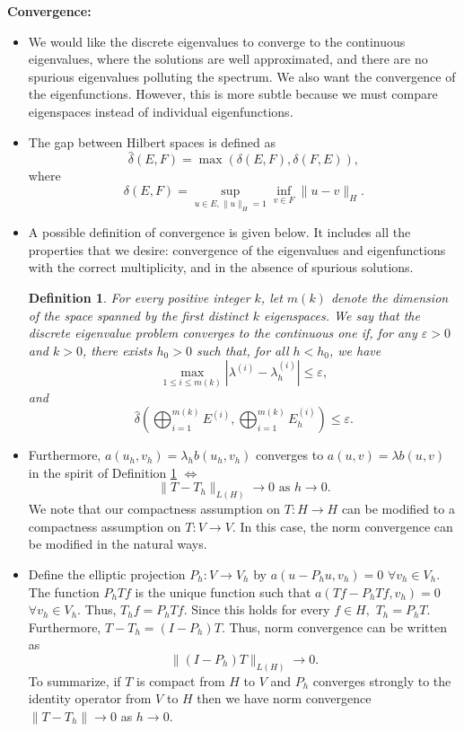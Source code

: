 \documentclass[12pt,a4paper]{article}
\theoremstyle{boldthm}
\theoremstyle{bolddefn}
\newtheorem{definition}[theorem]{Definition}
\begin{document}
\textbf{Convergence:}
\begin{itemize}
    \item We would like the discrete eigenvalues to converge to the continuous eigenvalues, where the solutions are well approximated, and there are no spurious eigenvalues polluting the spectrum. We also want the convergence of the eigenfunctions. However, this is more subtle because we must compare eigenspaces instead of individual eigenfunctions. 
    \item The gap between Hilbert spaces is defined as $$\hat \delta (E, F) = \max ( \delta(E, F) , \delta(F, E)),$$
    where
    $$ \delta(E, F) = \sup_{u \in E, \|u\|_H = 1} \inf_{v \in F} \|u-v\|_H.$$
    \item A possible definition of convergence is given below. It includes all the properties that we desire: convergence of the eigenvalues and eigenfunctions with the correct multiplicity, and in the absence of spurious solutions. 
    \begin{definition}\label{conv}
    For every positive integer $k$, let $m(k)$ denote the dimension of the space spanned by the first distinct $k$ eigenspaces. We say that the discrete eigenvalue problem converges to the continuous one if, for any $\varepsilon>0$ and $k>0$, there exists $h_0>0$ such that, for all $h<h_0$, we have
    $$
    \max_{1\leq i\leq m(k)}
    \left|\lambda^{(i)}-\lambda_h^{(i)}\right|
    \leq \varepsilon,
    $$
    and
    $$
    \widehat{\delta}
    \left(
    \bigoplus_{i=1}^{m(k)} E^{(i)},
    \bigoplus_{i=1}^{m(k)} E_h^{(i)}
    \right)
    \leq \varepsilon.
    $$
    \end{definition}


    \item Furthermore, $a(u_h, v_h) = \lambda_h b(u_h, v_h)$ converges to $a(u, v) = \lambda b(u, v)$ in the spirit of Definition \ref{conv} $\iff$ 
    $$ \| T - T_h \|_{L(H)} \rightarrow 0 \text{ as } h \rightarrow 0.$$
    We note that our compactness assumption on $T:H \rightarrow H$ can be modified to a compactness assumption on $T:V \rightarrow V.$ In this case, the norm convergence can be modified in the natural ways. 

    \item Define the elliptic projection $P_h : V \rightarrow V_h$ by $a(u- P_h u, v_h) = 0$ $\forall v_h \in V_h.$ The function $P_h Tf$ is the unique function such that $a(Tf - P_hTf, v_h) = 0$ $\forall v_h \in V_h.$ Thus, $T_h f = P_h Tf.$ Since this holds for every $f\in H,$ $T_h = P_h T.$ Furthermore, $T-T_h = (I - P_h)T.$ Thus, norm convergence can be written as 
    $$\|(I-P_h) T \|_{L(H)} \rightarrow 0.$$ To summarize, if $T$ is compact from $H $ to $V$ and $P_h$ converges strongly to the identity operator from $V$ to $H$ then we have norm convergence $\|T-T_h \| \rightarrow 0$ as $h\rightarrow 0.$
\end{itemize}
\end{document}
